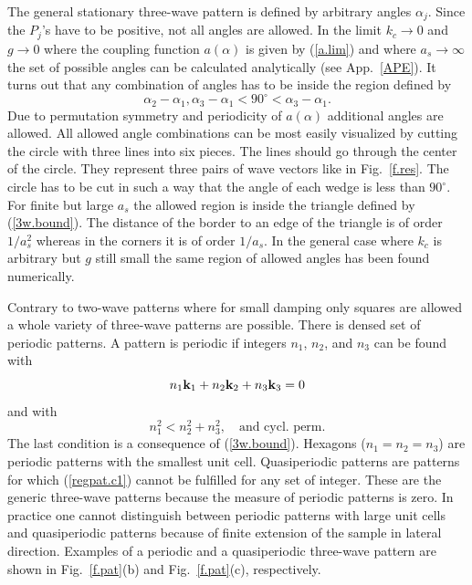 The general stationary three-wave pattern is defined by arbitrary
angles $\alpha_j$. Since the $P_j$'s have to be positive, not all
angles are allowed. In the limit $k_c\to 0$ and $g\to 0$ where the
coupling function $a(\alpha)$ is given by (\ref{a.lim}) and where
$a_s\to\infty$ the set of possible angles can be calculated
analytically (see App.~\ref{APE}). It turns out that any combination 
of angles has to be inside the region defined by 
\begin{equation}
  \alpha_2-\alpha_1,\alpha_3-\alpha_1<90^\circ<\alpha_3-\alpha_1.
  \label{3w.bound}
\end{equation}
Due to permutation symmetry and periodicity of $a(\alpha)$ additional
angles are allowed. All allowed angle combinations can be most easily
visualized by cutting the circle with three lines into six pieces.
The lines should go through the center of the circle. They represent
three pairs of wave vectors like in Fig.~\ref{f.res}. The circle has
to be cut in such a way that the angle of each wedge is less than
$90^\circ$. For finite but large $a_s$ the allowed region is inside
the triangle defined by (\ref{3w.bound}).  The distance of the border
to an edge of the triangle is of order $1/a_s^2$ whereas in the
corners it is of order $1/a_s$. In the general case where $k_c$ is
arbitrary but $g$ still small the same region of allowed angles has
been found numerically.

Contrary to two-wave patterns where for small damping only squares 
are allowed a whole variety of three-wave patterns are possible. There
is densed set of periodic patterns. A pattern is periodic if integers
$n_1$, $n_2$, and $n_3$ can be found with
\begin{equation}
  n_1{\bf k}_1+n_2{\bf k}_2+n_3{\bf k}_3=0
  \label{regpat.c1}
\end{equation}
and with
\begin{equation}
  n_1^2<n_2^2+n_3^2,\quad\mbox{and cycl. perm.}
  \label{regpat.c2}
\end{equation}
The last condition is a consequence of (\ref{3w.bound}). Hexagons 
($n_1=n_2=n_3$) are periodic patterns with the smallest unit
cell.  Quasiperiodic patterns are patterns for which
(\ref{regpat.c1}) cannot be fulfilled for any set of integer. These
are the generic three-wave patterns because the measure of periodic
patterns is zero. In practice one cannot distinguish between periodic
patterns with large unit cells and quasiperiodic patterns because of
finite extension of the sample in lateral direction.  Examples of a
periodic and a quasiperiodic three-wave pattern are shown in
Fig.~\ref{f.pat}(b) and Fig.~\ref{f.pat}(c), respectively.


